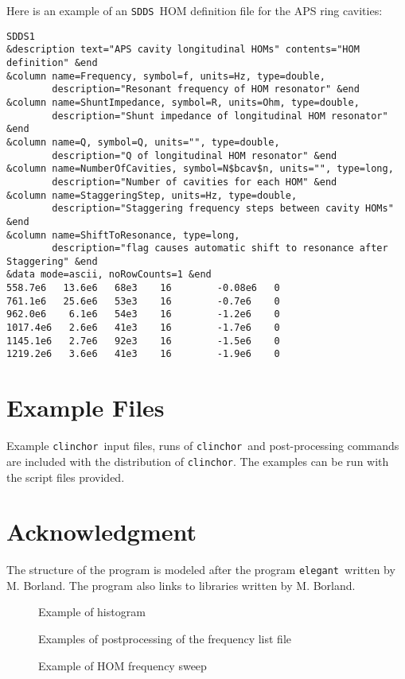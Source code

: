 \documentclass[11pt]{article}
\newcommand{\clinchor}{{\tt clinchor}}
\newcommand{\SDDS}{{\tt SDDS}}
\newcommand{\elegant}{{\tt elegant}}
\begin{document}
Here is an example of an \SDDS\ HOM definition file for the APS ring cavities:
\begin{verbatim}
SDDS1
&description text="APS cavity longitudinal HOMs" contents="HOM definition" &end
&column name=Frequency, symbol=f, units=Hz, type=double, 
        description="Resonant frequency of HOM resonator" &end
&column name=ShuntImpedance, symbol=R, units=Ohm, type=double,
        description="Shunt impedance of longitudinal HOM resonator" &end
&column name=Q, symbol=Q, units="", type=double,
        description="Q of longitudinal HOM resonator" &end
&column name=NumberOfCavities, symbol=N$bcav$n, units="", type=long,
        description="Number of cavities for each HOM" &end
&column name=StaggeringStep, units=Hz, type=double,
        description="Staggering frequency steps between cavity HOMs" &end
&column name=ShiftToResonance, type=long,
        description="flag causes automatic shift to resonance after Staggering" &end
&data mode=ascii, noRowCounts=1 &end
558.7e6   13.6e6   68e3    16        -0.08e6   0
761.1e6   25.6e6   53e3    16        -0.7e6    0
962.0e6    6.1e6   54e3    16        -1.2e6    0
1017.4e6   2.6e6   41e3    16        -1.7e6    0
1145.1e6   2.7e6   92e3    16        -1.5e6    0
1219.2e6   3.6e6   41e3    16        -1.9e6    0
\end{verbatim}

\section{Example Files}
Example \clinchor\ input files, runs of \clinchor\ and post-processing commands are 
included with the distribution of \clinchor.
The examples can be run with the script files provided. 

\section{Acknowledgment}
The structure of the program is modeled after the program \elegant\ written by M. Borland. The program
also links to libraries written by M. Borland.



\begin{figure}[p]
     \caption{Example of histogram} \label{fig:histogram-example}
\end{figure}
\begin{figure}
    \caption{Examples of postprocessing of the frequency list file} \label{fig:postprocess-examples}
\end{figure}
\begin{figure}
    \caption{Example of HOM frequency sweep} \label{fig:sweep-example} 
\end{figure}
\end{document}
